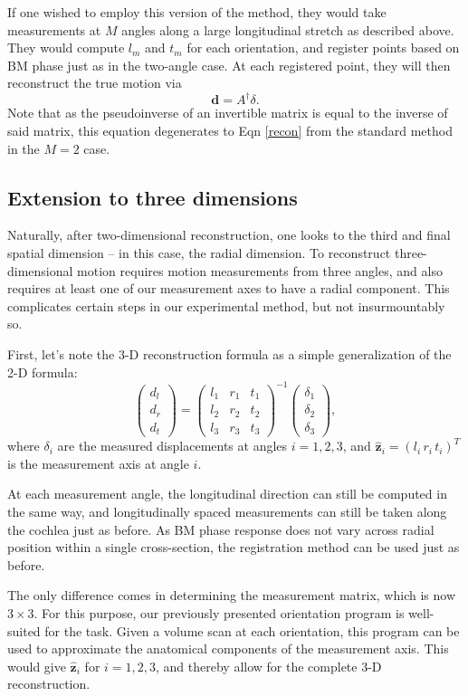 \documentclass[preprint,NumberedRefs]{JASA}
\begin{document}
\par{If one wished to employ this version of the method, they would take measurements at $M$ angles along a large longitudinal stretch as described above. They would compute $l_m$ and $t_m$ for each orientation, and register points based on BM phase just as in the two-angle case. At each registered point, they will then reconstruct the true motion via
\begin{equation}
	\mathbf{d} = A^\dagger \delta.
\end{equation}
Note that as the pseudoinverse of an invertible matrix is equal to the inverse of said matrix, this equation degenerates to Eqn \ref{recon} from the standard method in the $M=2$ case.
}

\subsection{Extension to three dimensions}
\par{Naturally, after two-dimensional reconstruction, one looks to the third and final spatial dimension -- in this case, the radial dimension. To reconstruct three-dimensional motion requires motion measurements from three angles, and also requires at least one of our measurement axes to have a radial component. This complicates certain steps in our experimental method, but not insurmountably so.}
\par{First, let's note the 3-D reconstruction formula as a simple generalization of the 2-D formula:
\renewcommand*{\arraystretch}{.5}
	\begin{equation}
		\begin{pmatrix}d_l\\d_r\\d_t\end{pmatrix} = \begin{pmatrix}l_1&r_1&t_1\\l_2&r_2&t_2\\l_3&r_3&t_3\end{pmatrix}^{-1}\begin{pmatrix}\delta_1\\ \delta_2 \\ \delta_3 \end{pmatrix},
	\end{equation}
	where $\delta_i$ are the measured displacements at angles $i=1,2,3$, and $\mathbf{\hat{z}}_i=(l_i\,r_i\,t_i)^T$ is the measurement axis at angle $i$. 
}
\par{At each measurement angle, the longitudinal direction can still be computed in the same way, and longitudinally spaced measurements can still be taken along the cochlea just as before. As BM phase response does not vary across radial position within a single cross-section, the registration method can be used just as before.}
\par{The only difference comes in determining the measurement matrix, which is now $3\times 3$. For this purpose, our previously presented orientation program is well-suited for the task. Given a volume scan at each orientation, this program can be used to approximate the anatomical components of the measurement axis. This would give $\mathbf{\hat{z}}_i$ for $i=1,2,3$, and thereby allow for the complete 3-D reconstruction.}
\end{document}
